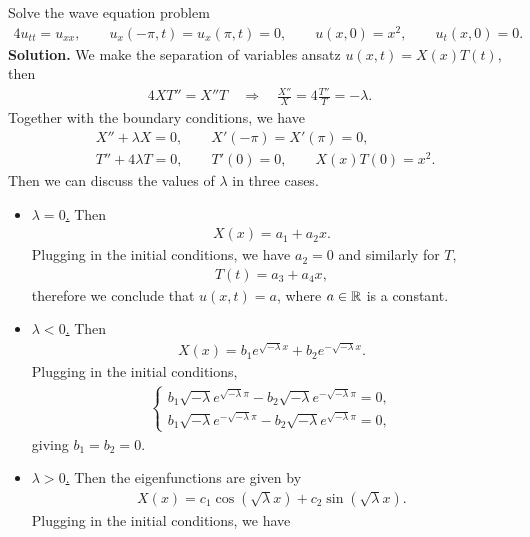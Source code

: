 \documentclass[12pt, a4paper]{article}
\begin{document}
\begin{spacing}{1.1}
Solve the wave equation problem
\begin{align*}
4u_{tt} = u_{xx}, \qquad u_x(-\pi, t) = u_x(\pi, t) = 0, \qquad u(x, 0) = x^2, \qquad u_t(x, 0) = 0.
\end{align*}
\textbf{Solution.} We make the separation of variables ansatz $u(x, t) = X(x)T(t)$, then
\begin{align*}
4XT'' = X''T \quad\Rightarrow\quad \frac{X''}{X} = 4\frac{T''}{T} = -\lambda.
\end{align*}
Together with the boundary conditions, we have
\begin{align*}
& X'' + \lambda X = 0, \qquad X'(-\pi) = X'(\pi) = 0, \\
& T'' + 4\lambda T = 0, \qquad T'(0) = 0, \qquad X(x)T(0) = x^2.
\end{align*}
Then we can discuss the values of $\lambda$ in three cases.
\begin{itemize}
	\item \underline{$\lambda = 0$.} Then
	\begin{align*}
	X(x) = a_1 + a_2x.
	\end{align*}
	Plugging in the initial conditions, we have $a_2 = 0$ and similarly for $T$,
	\begin{align*}
	T(t) = a_3 + a_4x,
	\end{align*}
	therefore we conclude that $u(x, t) = a$, where $a\in \mathbb{R}$ is a constant.
	\item \underline{$\lambda < 0$.} Then 
	\begin{align*}
	X(x) = b_1 e^{\sqrt{-\lambda}x} + b_2 e^{-\sqrt{-\lambda}x}.
	\end{align*}
	Plugging in the initial conditions,
	\begin{align*}
	\left\{
	\begin{array}{l}
	b_1 \sqrt{-\lambda}e^{\sqrt{-\lambda}\pi} - b_2 \sqrt{-\lambda}e^{-\sqrt{-\lambda}\pi} = 0, \\
	b_1\sqrt{-\lambda}e^{-\sqrt{-\lambda}\pi} - b_2\sqrt{-\lambda}e^{\sqrt{-\lambda}\pi} = 0,
	\end{array}
	\right.
	\end{align*}
	giving $b_1 = b_2 = 0$.
	\item \underline{$\lambda > 0$.} Then the eigenfunctions are given by
	\begin{align*}
	X(x) = c_1\cos(\sqrt{\lambda}x) + c_2\sin(\sqrt{\lambda}x).
	\end{align*}
	Plugging in the initial conditions, we have
	\begin{align*}

\end{align*}
\end{itemize}
\end{spacing}
\end{document}

